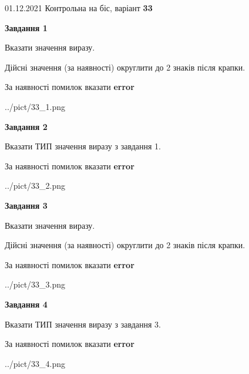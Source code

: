\documentclass[11pt, ukrainian]{article}
\begin{document}
{01.12.2021 Контрольна на біс, варіант  \No \textbf { 33 }\par}
{
\begin {large}
{\begin {center}\textbf{Завдання 1}\end {center}}\par
Вказати значення виразу. \par
Дійсні значення (за наявності) округлити до 2 знаків після крапки. \par
За наявності помилок вказати \textbf{error}

\begin{center}
	{../pict/33_1.png}
\end{center}
\newpage

{\begin {center}\textbf{Завдання 2}\end {center}}\par
Вказати ТИП значення виразу з завдання 1. \par
За наявності помилок вказати \textbf{error}

\begin{center}
	{../pict/33_2.png}
\end{center}
\newpage

{\begin {center}\textbf{Завдання 3}\end {center}}\par
Вказати значення виразу. \par
Дійсні значення (за наявності) округлити до 2 знаків після крапки. \par
За наявності помилок вказати \textbf{error}

\begin{center}
	{../pict/33_3.png}
\end{center}
\newpage

{\begin {center}\textbf{Завдання 4}\end {center}}\par
Вказати ТИП значення виразу з завдання 3. \par
За наявності помилок вказати \textbf{error}

\begin{center}
	{../pict/33_4.png}
\end{center}
\newpage


\end{large}}
\end{document}

